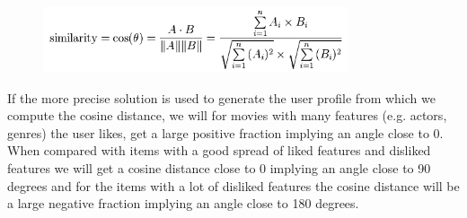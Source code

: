 \begin{figure}[H]
\centering
\includegraphics[width=0.8\textwidth]{Images/Cosinesimularity.png}
\caption{}
\label{Cosine}
\end{figure}

If the more precise solution is used to generate the user profile from which we compute the cosine distance, we will for movies with many features (e.g. actors, genres) the user likes, get a large positive fraction implying an angle close to 0. When compared with items with a good spread of liked features and disliked features we will get a cosine distance close to 0 implying an angle close to 90 degrees and for the items with a lot of disliked features the cosine distance will be a large negative fraction implying an angle close to 180 degrees.


